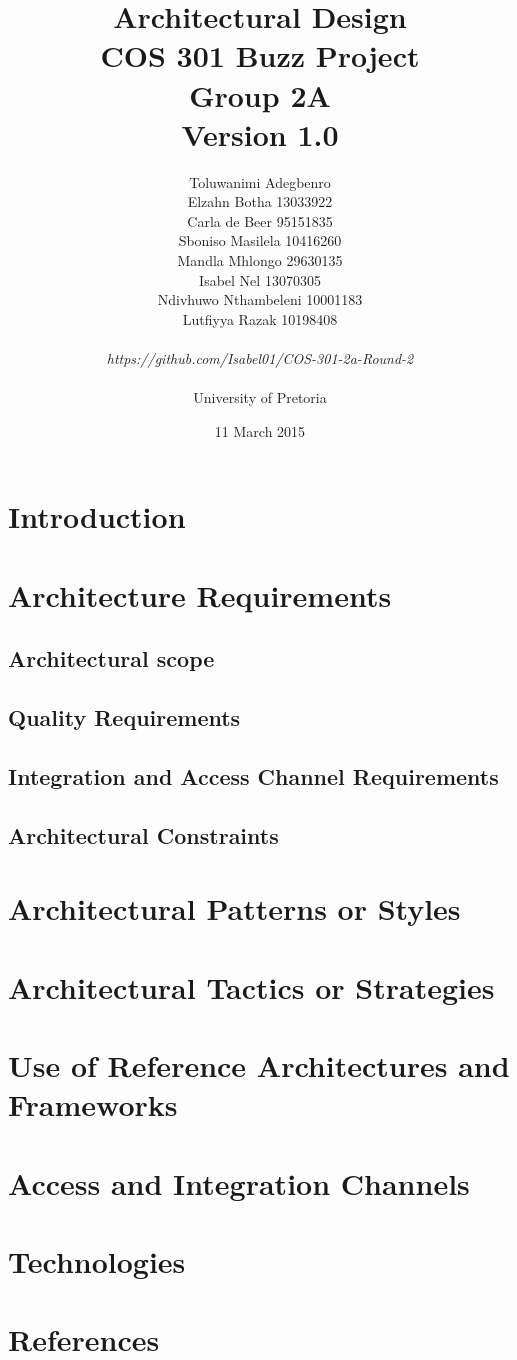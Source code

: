 \documentclass[a4paper]{article}
\title{Architectural Design
\\COS 301 Buzz Project
\\Group 2A
\\Version 1.0}
\author{Toluwanimi Adegbenro
\\Elzahn Botha 13033922
\\Carla de Beer 95151835
\\Sboniso Masilela 10416260
\\Mandla Mhlongo 29630135
\\Isabel Nel 13070305
\\Ndivhuwo Nthambeleni 10001183
\\Lutfiyya Razak 10198408
\\
\\
\textit{https://github.com/Isabel01/COS-301-2a-Round-2}
\\
\\ University of Pretoria}
\date{11 March 2015}
\begin{document}
\maketitle
\newpage


\tableofcontents
\newpage

\section{Introduction}

\section{Architecture Requirements}

\subsection{Architectural scope}

\subsection{Quality Requirements}

\subsection{Integration and Access Channel Requirements}

\subsection{Architectural Constraints}

\section{Architectural Patterns or Styles}

\section{Architectural Tactics or Strategies}

\section{Use of Reference Architectures and Frameworks}

\section{Access and Integration Channels}

\section{Technologies}

\section{References}
\end{document}
